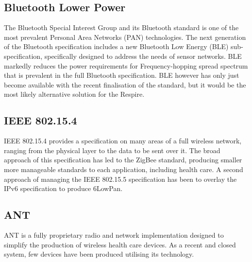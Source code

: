 \subsection{Bluetooth Lower Power}
The Bluetooth Special Interest Group and its Bluetooth standard is one of the most prevalent
Personal Area Networks (PAN) technologies. The next generation of the Bluetooth specification
includes a new Bluetooth Low Energy (BLE) sub-specification, specifically designed to address the
needs of sensor networks. BLE markedly reduces the power requirements for Frequency-hopping
spread spectrum that is prevalent in the full Bluetooth specification. BLE however has only just
become available with the recent finalisation of the standard, but it would be the most likely
alternative solution for the Respire.


\subsection{IEEE 802.15.4}
IEEE 802.15.4 provides a specification on many areas of a full wireless network, ranging from the
physical layer to the data to be sent over it. The broad approach of this specification has led to the
ZigBee standard, producing smaller more manageable standards to each application, including
health care. A second approach of managing the IEEE 802.15.5 specification has been to overlay the
IPv6 specification to produce 6LowPan.


\subsection{ANT}
ANT is a fully proprietary radio and network implementation designed to simplify the production of
wireless health care devices. As a recent and closed system, few devices have been produced
utilising its technology.


